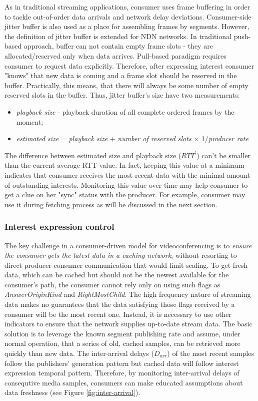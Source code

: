 \documentclass{icn/sig-alternate-2012} %
\begin{document}
As in traditional streaming applications, consumer uses frame buffering in order to tackle out-of-order data arrivals and network delay deviations. Consumer-side jitter buffer is also used as a place for assembling frames by segments. However, the definition of jitter buffer is extended for NDN networks. In traditional push-based approach, buffer can not contain empty frame slots - they are allocated/reserved only when data arrives. Pull-based paradigm requires consumer to request data explicitly. Therefore, after expressing interest consumer "knows" that new data is coming and a frame slot should be reserved in the buffer. Practically, this means, that there will always be some number of empty reserved slots in the buffer. Thus, jitter buffer's size have two measurements:
\begin{itemize}[label={}]
\item \textit{playback size} - playback duration of all complete ordered frames by the moment;
\item \textit{estimated size} = \textit{playback size} + \textit{number of reserved slots} $\times$ 1/\textit{producer rate}
\end{itemize}

The difference between estimated size and playback size ($RTT^{\prime}$) can't be smaller than the current average RTT value. In fact, keeping this value at a minimum indicates that consumer receives the most recent data with the minimal amount of outstanding interests. Monitoring this value over time may help consumer to get a clue on her "sync" status with the producer. For example, consumer may use it during fetching process as will be discussed in the next section. 

\subsubsection{Interest expression control}

The key challenge in a consumer-driven model for videoconferencing is to \emph{ensure the consumer gets the latest data in a caching network}, without resorting to direct producer-consumer communication that would limit scaling. To get fresh data, which can be cached but should not be the newest available for the consumer's path,  the consumer cannot rely only on using such flags as \textit{AnswerOriginKind} and \textit{RightMostChild}. The high frequency nature of streaming data makes no guarantees that the data satisfying those flags received by a consumer will be the most recent one. Instead, it is necessary to use other indicators to ensure that the network supplies up-to-date stream data. The basic solution is to leverage the known segment publishing rate and assume, under normal operation, that a series of old, cached samples, can be retrieved more quickly than new data. The inter-arrival delays ($D_{arr}$) of the most recent samples follow the publishers' generation pattern but cached data will follow interest expression temporal pattern. Therefore, by monitoring inter-arrival delays of consequtive media samples, consumers can make educated assumptions about data freshness (see Figure \ref{fig:inter-arrival}).
\end{document}
